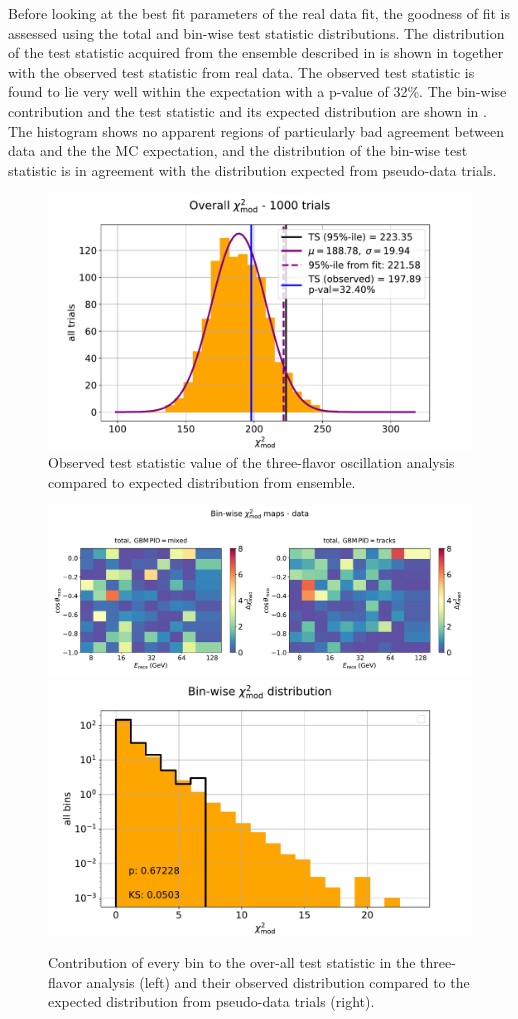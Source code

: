 Before looking at the best fit parameters of the real data fit, the goodness of fit is assessed using the total and bin-wise test statistic distributions. The distribution of the test statistic acquired from the ensemble described in  is shown in  together with the observed test statistic from real data. The observed test statistic is found to lie very well within the expectation with a p-value of 32\%. The bin-wise contribution and the test statistic and its expected distribution are shown in . The histogram shows no apparent regions of particularly bad agreement between data and the the MC expectation, and the distribution of the bin-wise test statistic is in agreement with the distribution expected from pseudo-data trials.

\begin{figure}
    \centering
    \includegraphics[width=0.8\linewidth]{figures/measurement/three_flavor/ensemble_pre_fit/overall_ts_wings_trials.pdf}
    \caption{Observed test statistic value of the three-flavor oscillation analysis compared to expected distribution from ensemble.}
    \label{fig:three-flavor-ts-ensemble}
\end{figure}

\begin{figure}
    \centering
    \includegraphics[height=0.22\linewidth]{figures/measurement/three_flavor/ensemble_pre_fit/real_fit_binwise_pulls_pre_bugfix.pdf}
    \includegraphics[height=0.22\linewidth]{figures/measurement/three_flavor/ensemble_pre_fit/binwise_ts_wings_trials.pdf}
    \caption{Contribution of every bin to the over-all test statistic in the three-flavor analysis (left) and their observed distribution compared to the expected distribution from pseudo-data trials (right).}
    \label{fig:three-flavor-binwise-ts}
\end{figure}

